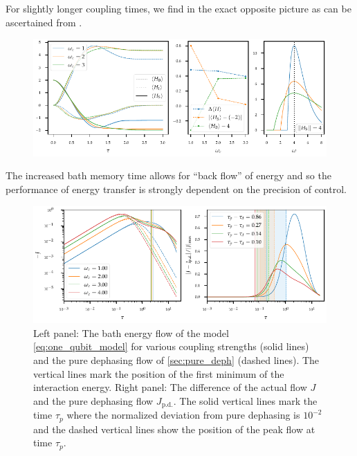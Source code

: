 For slightly longer coupling times, we find in
the exact opposite picture as can be ascertained from .
\begin{figure}[h]
  \centering
  \includegraphics{figs/one_bath_syst/markov_analysis_longer}
  \caption{\label{fig:markov_analysis_longer}}
\end{figure}
The increased bath memory time allows for ``back flow'' of energy and
so the performance of energy transfer is strongly dependent on the
precision of control.




\begin{figure}[h]
  \centering
  \includegraphics{figs/one_bath_syst/omega_initial_slip}
  \caption{\label{fig:omega_initial_slip} Left panel: The bath energy
    flow of the model \cref{eq:one_qubit_model} for various coupling
    strengths (solid lines) and the pure dephasing flow of
    \cref{sec:pure_deph} (dashed lines). The vertical lines mark the
    position of the first minimum of the interaction energy. Right
    panel: The difference of the actual flow \(J\) and the pure
    dephasing flow \(J_\mathrm{p.d.}\). The solid vertical lines mark
    the time \(τ_p\) where the normalized deviation from pure
    dephasing is \(10^{-2}\) and the dashed vertical lines show the
    position of the peak flow at time \(τ_p\).}
\end{figure}

